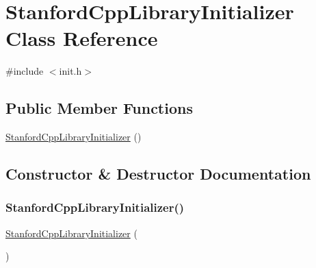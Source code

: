 \hypertarget{classstanfordcpplib_1_1StanfordCppLibraryInitializer}{}\section{Stanford\+Cpp\+Library\+Initializer Class Reference}
\label{classstanfordcpplib_1_1StanfordCppLibraryInitializer}


{\ttfamily \#include $<$init.\+h$>$}

\subsection*{Public Member Functions}
\begin{DoxyCompactItemize}
\item 
\mbox{\hyperlink{classstanfordcpplib_1_1StanfordCppLibraryInitializer_ac31212a0e24cbc0d17c78bcbec07afb7}{Stanford\+Cpp\+Library\+Initializer}} ()
\end{DoxyCompactItemize}


\subsection{Constructor \& Destructor Documentation}
\mbox{\label{classstanfordcpplib_1_1StanfordCppLibraryInitializer_ac31212a0e24cbc0d17c78bcbec07afb7}} 
\subsubsection{\texorpdfstring{Stanford\+Cpp\+Library\+Initializer()}{StanfordCppLibraryInitializer()}}
{\footnotesize\ttfamily \mbox{\hyperlink{classstanfordcpplib_1_1StanfordCppLibraryInitializer}{Stanford\+Cpp\+Library\+Initializer}} (\begin{DoxyParamCaption}{ }\end{DoxyParamCaption})\hspace{0.3cm}{\ttfamily [inline]}}

